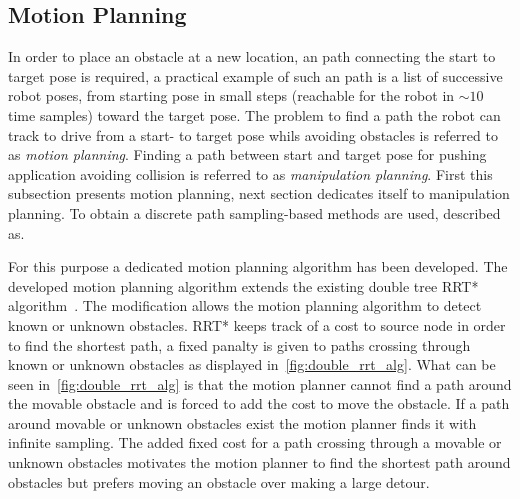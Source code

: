 \subsection{Motion Planning}
\label{subsec:motion_planning}

In order to place an obstacle at a new location, an path connecting the start to target pose is required, a practical example of such an path is a list of successive robot poses, from starting pose in small steps (reachable for the robot in $\sim10$ time samples) toward the target pose. The problem to find a path the robot can track to drive from a start- to target pose whils avoiding obstacles is referred to as \textit{motion planning}. Finding a path between start and target pose for pushing application avoiding collision is referred to as \textit{manipulation planning}. First this subsection presents motion planning, next section dedicates itself to manipulation planning. To obtain a discrete path sampling-based methods are used, described as.\bs

\textit{}\bs

For this purpose a dedicated motion planning algorithm has been developed. The developed motion planning algorithm extends the existing double tree \ac{RRT*} algorithm~\cite{chen_fast_2018}. The modification allows the motion planning algorithm to detect known or unknown obstacles. \ac{RRT*} keeps track of a cost to source node in order to find the shortest path, a fixed panalty is given to paths crossing through known or unknown obstacles as displayed in~\cref{fig:double_rrt_alg}. What can be seen in~\cref{fig:double_rrt_alg} is that the motion planner cannot find a path around the movable obstacle and is forced to add the cost to move the obstacle. If a path around movable or unknown obstacles exist the motion planner finds it with infinite sampling. The added fixed cost for a path crossing through a movable or unknown obstacles motivates the motion planner to find the shortest path around obstacles but prefers moving an obstacle over making a large detour.

